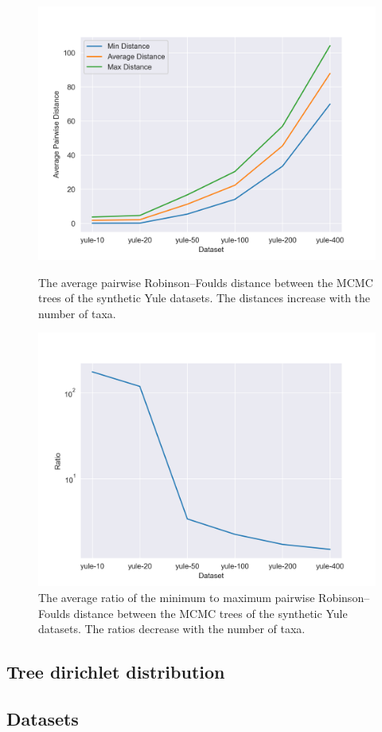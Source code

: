 \documentclass[10pt,letterpaper]{article}
\begin{document}
\begin{figure}[h]
    \centering
    \begin{minipage}[t]{0.45\textwidth}
        \centering
        \includegraphics[width=\textwidth]{figures/curse_distance.png}
        \caption{The average pairwise Robinson–Foulds distance between the MCMC trees of the synthetic Yule datasets. The distances increase with the number of taxa.}

		\label{fig:curse1}
    \end{minipage}
    \hfill
    \begin{minipage}[t]{0.45\textwidth}
        \centering
        \includegraphics[width=\textwidth]{figures/curse_ratio.png}
        \caption{The average ratio of the minimum to maximum pairwise Robinson–Foulds distance between the MCMC trees of the synthetic Yule datasets. The ratios decrease with the number of taxa.}

		\label{fig:curse2}
    \end{minipage}
\end{figure}

\subsection*{Tree dirichlet distribution}

\subsection*{Datasets}

\nolinenumbers


\end{document}
